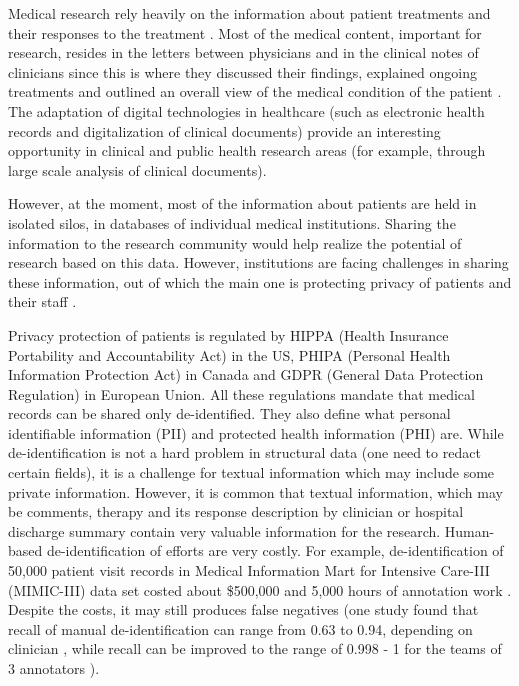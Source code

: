 \documentclass[a4paper,twoside]{article}
\begin{document}
Medical research rely heavily on the information about patient treatments and their responses to the treatment \cite{schneeweiss2005review,calapodescu2017semi}. Most of the medical content, important for research, resides in the letters between physicians and in the clinical notes of clinicians since this is where they discussed their findings, explained ongoing treatments and outlined an overall view of the medical condition of the patient \cite{sweeney1996replacing}.  The adaptation of digital technologies in healthcare (such as electronic health records and digitalization of clinical documents) provide an interesting opportunity in clinical and public health research areas (for example, through large scale analysis of clinical documents). 

However, at the moment, most of the information about patients are held in isolated silos, in databases of individual medical institutions. Sharing the information to the research community would help realize the potential of research based on this data. However, institutions are facing challenges in sharing these information, out of which the main one is protecting privacy of patients and their staff \cite{calapodescu2017semi}. 

Privacy protection of patients is regulated by HIPPA (Health Insurance Portability and Accountability Act) in the US, PHIPA (Personal Health Information Protection Act) in Canada and GDPR (General Data Protection Regulation) in European Union. All these regulations mandate that medical records can be shared only de-identified. They also define what personal identifiable information (PII) and protected health information (PHI) are. While de-identification is not a hard problem in structural data (one need to redact certain fields), it is a challenge for textual information which may include some private information. However, it is common that textual information, which may be comments, therapy and its response description by clinician or hospital discharge summary contain very valuable information for the research. Human-based de-identification of efforts are very costly. For example, de-identification of 50,000 patient visit records in Medical Information Mart for Intensive Care-III (MIMIC-III) data set costed about \$500,000 and 5,000 hours of annotation work \cite{johnson2016mimic}. Despite the costs, it may still produces false negatives (one study found that recall of manual de-identification can range from 0.63 to 0.94, depending on clinician \cite{neamatullah2008automated}, while recall can be improved to the range of 0.998 - 1 for the teams of 3 annotators \cite{carrell2016juice}).    
\end{document}
